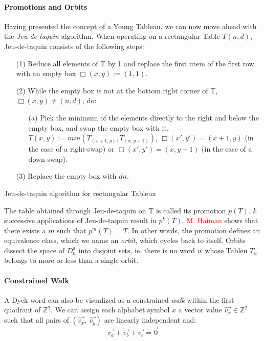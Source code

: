 \documentclass[nonatbib,numbers,10pt]{sigplanconf}
\newcommand\todo[1]{\textcolor{red}{#1}}
\begin{document}
\paragraph{Promotions and Orbits}
Having presented the concept of a Young Tableau, we can now move ahead with the \textit{Jeu-de-taquin} algorithm. When operating on a rectangular Table $T(n,d)$, Jeu-de-taquin consists of the following steps:
\begin{table}[h!]
\begin{enumerate}
\item[(1)] Reduce all elements of T by 1 and replace the first utem of the first row with an empty box $ \Box (x,y) := (1,1)$. 
\item[(2)] While the empty box is not at the bottom right corner of T, $ \Box(x,y) \neq (n,d)$, do:
\begin{enumerate}
\item[(a)] Pick the minimum of the elements directly to the right and below the empty box, and swap the empty box with it. $ T(x, y) := min(T_{(x+1,y)}, T_{(x,y+1)})$, $ \Box (x',y') = (x+1, y)$ (in the case of a right-swap) or $\Box (x',y') = (x,y+1)$ (in the case of a down-swap).
\end{enumerate}
\item[(3)] Replace the empty box with $dn$.
\end{enumerate}
\caption{Jeu-de-taquin algorithm for rectangular Tableux}
\end{table}

The table obtained through Jeu-de-taquin on T is called its promotion $p(T)$. $k$ successive applications of Jeu-de-taquin result in $p^k(T)$. \todo{M. Haiman} shows that there exists a $m$ such that $p^m(T)=T$. In other words, the promotion defines an equivalence class, which we name an \textit{orbit}, which cycles back to itself. Orbits dissect the space of $D^d_n$ into disjoint sets, ie. there is no word $w$ whose Tableu $T_w$ belongs to more or less than a single orbit. 
\paragraph{Constrained Walk}
A Dyck word can also be visualized as a constrained \textit{walk} within the first quadrant of $\mathbb{Z}^2$. We can assign each alphabet symbol $x$ a vector value $\vec{v_x} \in \mathbb{Z}^2$ such that all pairs of $(\vec{v_x},\ \vec{v_y})$ are linearly independent and:
\begin{equation*}
\vec{v_a} + \vec{v_b} + \vec{v_c} = \vec{0}
\end{equation*}
\end{document}
